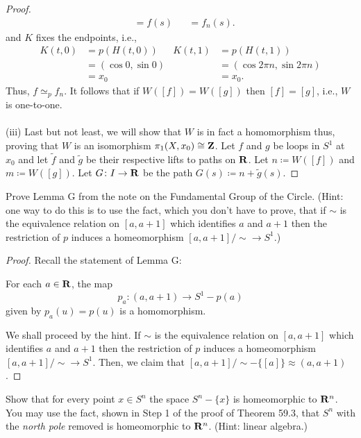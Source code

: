 \begin{proof}
\begin{align*}
&=f(s)&
&=f_n(s).
\end{align*}
and $K$ fixes the endpoints, i.e.,
\begin{align*}
K(t,0)&=p(H(t,0))&
K(t,1)&=p(H(t,1))\\
&=(\cos 0,\sin 0)&
&=(\cos 2\pi n,\sin 2\pi n)\\
&=x_0&
&=x_0.
\end{align*}
Thus, $f\simeq_p f_n$. It follows that if $W([f])=W([g])$ then $[f]=[g]$,
i.e., $W$ is one-to-one.
\\\\
(iii) Last but not least, we will show that $W$ is in fact a homomorphism
thus, proving that $W$ is an isomorphism $\pi_1(X,x_0)\cong\mathbf{Z}$. Let $f$
and $g$ be loops in $S^1$ at $x_0$ and let $\tilde f$ and $\tilde g$ be
their respective lifts to paths on $\mathbf{R}$. Let $n\coloneqq W([f])$ and
$m\coloneqq W([g])$. Let $G\colon I\to\mathbf{R}$ be the path $G(s)\coloneqq
n+\tilde g(s)$.
\end{proof}
\newpage
\begin{problem}[(B)]
Prove Lemma G from the note on the Fundamental Group of the Circle. (Hint:
one way to do this is to use the fact, which you don’t have to prove, that
if $\sim$ is the equivalence relation on $[a,a+1]$ which identifies $a$ and
$a+1$ then the restriction of $p$ induces a homeomorphism
$[a,a+1]/{\sim}\to S^1$.)
\end{problem}
\begin{proof}
Recall the statement of Lemma G:
\begin{lemma*}[G]
For each $a\in\mathbf{R}$, the map
\[
p_a\colon(a,a+1)\longrightarrow S^1-p(a)
\]
given by $p_a(u)=p(u)$ is a homomorphism.
\end{lemma*}
We shall proceed by the hint. If $\sim$ is the equivalence
relation on $[a,a+1]$ which identifies $a$ and $a+1$ then the
restriction of $p$ induces a homeomorphism $[a,a+1]/{\sim}\to
S^1$. Then, we claim that
$[a,a+1]/{\sim}-\{[a]\}\approx(a,a+1)$.
\end{proof}
\newpage
\begin{problem}[(C)]
Show that for every point $x\in S^n$ the space $S^n-\{x\}$ is homeomorphic to
$\mathbf{R}^n$. You may use the fact, shown in Step 1 of the proof of Theorem
59.3, that $S^n$ with the \emph{north pole} removed is homeomorphic to
$\mathbf{R}^n$. (Hint: linear algebra.)
\end{problem}
